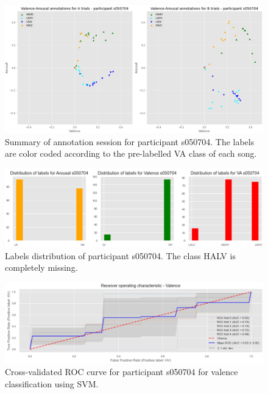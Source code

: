 \begin{figure}[!htb]
\includegraphics[width=16cm]{img/appendix/valence_unbalanced.png}
\centering
\caption{Summary of annotation session for participant s050704. The labels are color coded according to the pre-labelled 
VA class of each song.}\label{fig:valence_unbalanced}
\end{figure}

\begin{figure}[!htb]
\includegraphics[width=16cm]{img/appendix/valence_unbalanced_distribution.png}
\centering
\caption{Labels distribution of participant s050704. The class HALV is completely missing.}\label{fig:valence_unbalanced_distribution}
\end{figure}

\begin{figure}[!htb]
\includegraphics[width=16cm]{img/appendix/valence_unbalanced_roc_svm.png}
\centering
\caption{Cross-validated ROC curve for participant s050704 for valence classification using SVM.}\label{fig:valence_unbalanced_roc_svm}
\end{figure}

